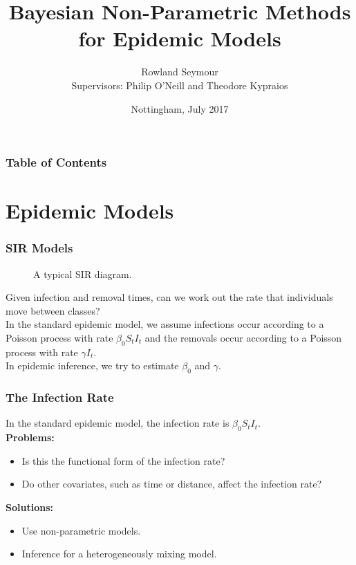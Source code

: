 \documentclass[demo]{beamer}
\title{Bayesian Non-Parametric Methods for Epidemic Models}
\author{Rowland Seymour \\ Supervisors: Philip O'Neill and Theodore Kypraios}
\institute{University of Nottingham}
\date{Nottingham, July 2017}
\begin{document}
\frame{\titlepage}

\begin{frame}
\frametitle{Table of Contents}
\tableofcontents
\end{frame}


\section{Epidemic Models}
\begin{frame}
	\frametitle{SIR Models}
	\begin{figure}[h]
\begin{center}
\end{center}
\caption{A typical SIR diagram.}
\label{fig: Basic SIR Diagram}
\end{figure}

Given infection and removal times, can we work out the rate that individuals move between classes? \\
\vspace{1em}
In the standard epidemic model, we assume infections occur according to a Poisson process with rate $\beta_0 S_tI_t$ and the removals occur according to a Poisson process with rate $\gamma I_t$. \\
\vspace{1em}
In epidemic inference, we try to estimate $\beta_0$ and $\gamma$.



\end{frame}

\begin{frame}
	\frametitle{The Infection Rate}
	In the standard epidemic model, the infection rate is $\beta_0 S_t I_t$. \\
	\vspace{1em}
	\textbf{Problems:}\\
	\begin{itemize}
	\setlength\itemsep{1em}
		\item Is this the functional form of the infection rate?
		\item Do other covariates, such as time or distance, affect the infection rate?
	\end{itemize}
	\textbf{Solutions:}\\
		\begin{itemize}
	\setlength\itemsep{1em}
		\item Use non-parametric models. 
		\item Inference for a heterogeneously mixing model.
	\end{itemize}
\end{frame}
\end{document}
